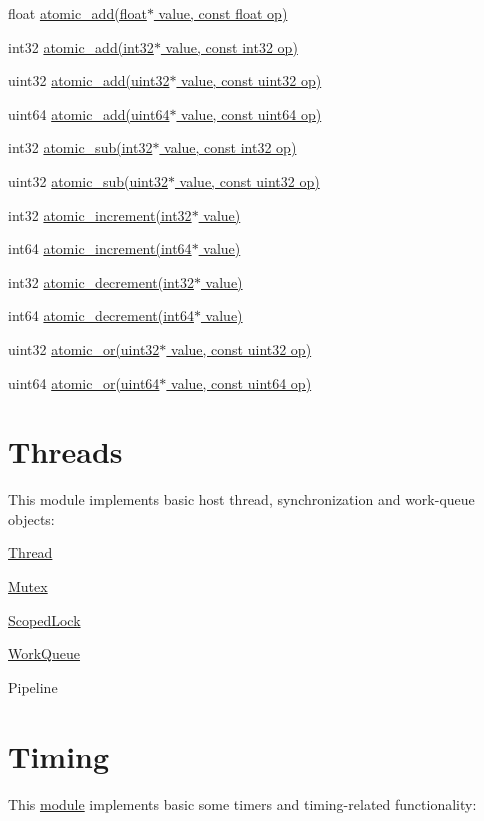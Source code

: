 \begin{DoxyItemize}
\item float \hyperlink{group___atomics_ga0c9d949be7ac5b6f27a232c7cd27a05c}{atomic\+\_\+add(float$\ast$ value, const float op)}
\item int32 \hyperlink{group___atomics_ga584797bd163a76c90bf0fb5c7df58de4}{atomic\+\_\+add(int32$\ast$ value, const int32 op)}
\item uint32 \hyperlink{group___atomics_ga130aea0c6d0c91af08bea4b52d6a8208}{atomic\+\_\+add(uint32$\ast$ value, const uint32 op)}
\item uint64 \hyperlink{group___atomics_gaed434d4f310d826a6e39932269de15c4}{atomic\+\_\+add(uint64$\ast$ value, const uint64 op)}
\item int32 \hyperlink{group___atomics_ga3efc1d5c63f30d1ee11887f76744bafe}{atomic\+\_\+sub(int32$\ast$ value, const int32 op)}
\item uint32 \hyperlink{group___atomics_ga9d9415fae4e05362c8d6f43d2fd61c60}{atomic\+\_\+sub(uint32$\ast$ value, const uint32 op)}
\item int32 \hyperlink{group___atomics_ga3034bbde9594dc3c4894fe31ad5a0b3c}{atomic\+\_\+increment(int32$\ast$ value)}
\item int64 \hyperlink{group___atomics_ga57595e5240e01e562a47816a82e14dd2}{atomic\+\_\+increment(int64$\ast$ value)}
\item int32 \hyperlink{group___atomics_ga60cd477d17c1ff78aa673ce06b60b569}{atomic\+\_\+decrement(int32$\ast$ value)}
\item int64 \hyperlink{group___atomics_gae94ecfb92e8d261326f527daa39c770d}{atomic\+\_\+decrement(int64$\ast$ value)}
\item uint32 \hyperlink{group___atomics_ga4b242819dd9c2a9986e0ea35b4883f67}{atomic\+\_\+or(uint32$\ast$ value, const uint32 op)}
\item uint64 \hyperlink{group___atomics_ga5d15edb3c64f3cde839eb76c54aacf7c}{atomic\+\_\+or(uint64$\ast$ value, const uint64 op)} 
\end{DoxyItemize}\hypertarget{threads_page}{}\section{Threads}\label{threads_page}
This module implements basic host thread, synchronization and work-\/queue objects\+:


\begin{DoxyItemize}
\item \hyperlink{classcugar_1_1_thread}{Thread}
\item \hyperlink{classcugar_1_1_mutex}{Mutex}
\item \hyperlink{classcugar_1_1_scoped_lock}{Scoped\+Lock}
\item \hyperlink{classcugar_1_1_work_queue}{Work\+Queue}
\item Pipeline 
\end{DoxyItemize}\hypertarget{timing_page}{}\section{Timing}\label{timing_page}
This \hyperlink{group___timers_module}{module} implements basic some timers and timing-\/related functionality\+:


